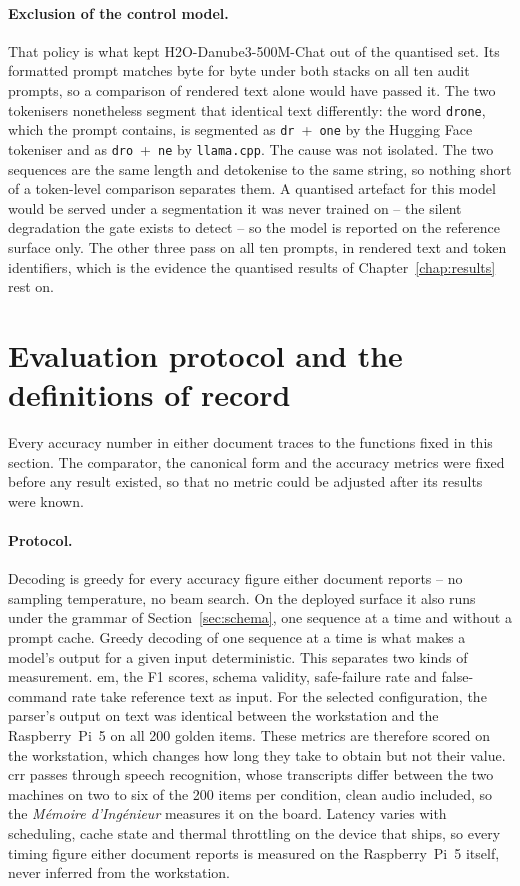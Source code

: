 \paragraph{Exclusion of the control model.} That policy is what kept H2O-Danube3-500M-Chat out of the
quantised set. Its formatted prompt matches byte for byte under both stacks on all ten audit
prompts, so a comparison of rendered text alone would have passed it. The two tokenisers
nonetheless segment that identical text differently: the word \texttt{drone}, which the prompt
contains, is segmented as \texttt{dr}~+~\texttt{one} by the Hugging Face tokeniser and as
\texttt{dro}~+~\texttt{ne} by \texttt{llama.cpp}. The cause was not isolated. The two sequences are
the same length and detokenise to the same string, so nothing short of a token-level comparison
separates them. A quantised artefact for this model would be served under a segmentation it was
never trained on -- the silent degradation the gate exists to detect -- so the model is reported on
the reference surface only. The other three pass on all ten prompts, in rendered text and token
identifiers, which is the evidence the quantised results of Chapter~\ref{chap:results} rest on.

\section{Evaluation protocol and the definitions of record}
\label{sec:definitions-of-record}
Every accuracy number in either document traces to the functions fixed in this section. The
comparator, the canonical form and the accuracy metrics were fixed before any result existed, so
that no metric could be adjusted after its results were known.

\paragraph{Protocol.} Decoding is greedy for every accuracy figure either document reports -- no
sampling temperature, no beam search. On the deployed surface it also runs under the grammar of
Section~\ref{sec:schema}, one sequence at a time and without a prompt cache. Greedy decoding of one
sequence at a time is what makes a model's output for a given input deterministic. This separates
two kinds of measurement. \Gls{em}, the F1 scores, schema validity, safe-failure rate and
false-command rate take reference text as input. For the selected configuration, the parser's output
on text was identical between the workstation and the Raspberry~Pi~5 on all 200 golden items. These
metrics are therefore scored on the workstation, which changes how long they take to obtain but not
their value. \Gls{crr} passes through speech recognition, whose transcripts differ
between the two machines on two to six of the 200 items per condition, clean audio included, so the \emph{M\'emoire
d'Ing\'enieur} measures it on the board. Latency varies with scheduling, cache state and thermal
throttling on the device that ships, so every timing figure either document reports is measured on
the Raspberry~Pi~5 itself, never inferred from the workstation.

